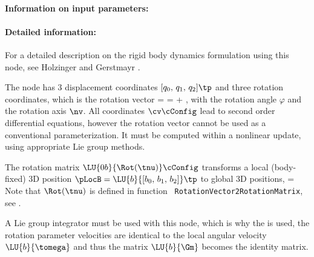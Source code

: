 \paragraph{Information on input parameters:} 
\finishTable
 \noindent
    \paragraph{Detailed information:}
    For a detailed description on the rigid body dynamics formulation using this node, see Holzinger and Gerstmayr \cite{HolzingerGerstmayr2020}.

    The node has 3 displacement coordinates $[q_0,\,q_1,\,q_2]\tp$ and three rotation coordinates, which is the rotation vector 
    \be
      \tnu = \varphi \nv = \tnu\cConfig + \tnu\cRef,
    \ee
    with the rotation angle $\varphi$ and the rotation axis $\nv$.
    All coordinates $\cv\cConfig$ lead to second order differential equations, however the rotation vector cannot be used as a conventional parameterization. It must be computed within a nonlinear update, using appropriate Lie group methods.

    The rotation matrix $\LU{0b}{\Rot(\tnu)}\cConfig$ transforms a local (body-fixed) 3D position 
    $\pLocB = \LU{b}{[b_0,\,b_1,\,b_2]}\tp$ to global 3D positions,
    \be
      \cConfig = \cConfig {} 
    \ee
    Note that $\Rot(\tnu)$ is defined in function \texttt{ RotationVector2RotationMatrix}, see .
    
    A Lie group integrator must be used with this node, which is why the is used, the 
    rotation parameter velocities are identical to the local angular velocity $\LU{b}{\tomega}$ and thus the 
    matrix $ \LU{b}{\Gm}$ becomes the identity matrix.
    
